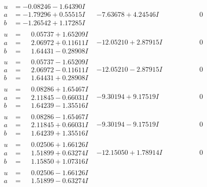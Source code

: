 \documentclass[1p]{elsarticle_modified}
\theoremstyle{definition}
\begin{document}
$$\begin{array}{c|c|c}
 \hline 
\begin{aligned}
u &= -0.08246 - 1.64390 I \\
a &= -1.79296 + 0.55515 I \\
b &= -1.26542 + 1.17285 I\end{aligned}
 & -7.63678 + 4.24546 I & \phantom{-0.000000 } 0 \\ \hline\begin{aligned}
u &= \phantom{-}0.05737 + 1.65209 I \\
a &= \phantom{-}2.06972 + 0.11611 I \\
b &= \phantom{-}1.64431 - 0.28908 I\end{aligned}
 & -12.05210 + 2.87915 I & \phantom{-0.000000 } 0 \\ \hline\begin{aligned}
u &= \phantom{-}0.05737 - 1.65209 I \\
a &= \phantom{-}2.06972 - 0.11611 I \\
b &= \phantom{-}1.64431 + 0.28908 I\end{aligned}
 & -12.05210 - 2.87915 I & \phantom{-0.000000 } 0 \\ \hline\begin{aligned}
u &= \phantom{-}0.08286 + 1.65467 I \\
a &= \phantom{-}2.11845 - 0.66031 I \\
b &= \phantom{-}1.64239 - 1.35516 I\end{aligned}
 & -9.30194 + 9.17519 I & \phantom{-0.000000 } 0 \\ \hline\begin{aligned}
u &= \phantom{-}0.08286 - 1.65467 I \\
a &= \phantom{-}2.11845 + 0.66031 I \\
b &= \phantom{-}1.64239 + 1.35516 I\end{aligned}
 & -9.30194 - 9.17519 I & \phantom{-0.000000 } 0 \\ \hline\begin{aligned}
u &= \phantom{-}0.02506 + 1.66126 I \\
a &= \phantom{-}1.51899 + 0.63274 I \\
b &= \phantom{-}1.15850 + 1.07316 I\end{aligned}
 & -12.15050 + 1.78914 I & \phantom{-0.000000 } 0 \\ \hline\begin{aligned}
u &= \phantom{-}0.02506 - 1.66126 I \\
a &= \phantom{-}1.51899 - 0.63274 I \\

\end{aligned}
\end{array}$$
\end{document}
